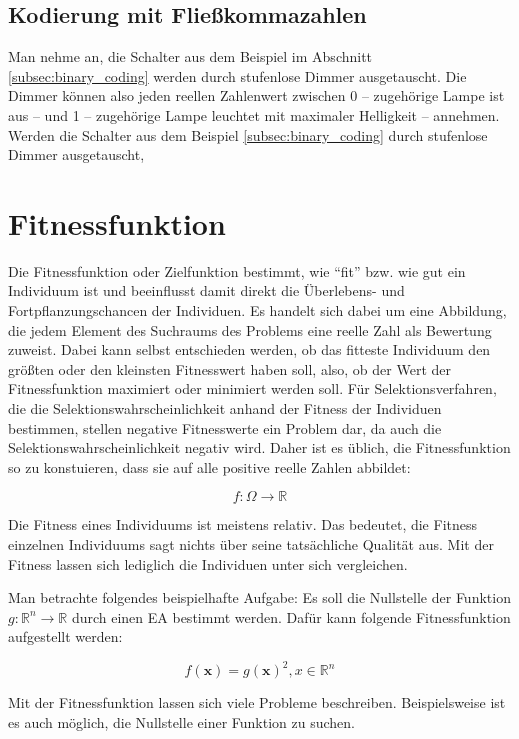 \subsection{Kodierung mit Fließkommazahlen}
Man nehme an, die Schalter aus dem Beispiel im Abschnitt \ref{subsec:binary_coding} werden durch stufenlose Dimmer ausgetauscht. Die Dimmer können also jeden reellen Zahlenwert zwischen 0 -- zugehörige Lampe ist aus -- und 1 -- zugehörige Lampe leuchtet mit maximaler Helligkeit -- annehmen. 
Werden die Schalter aus dem Beispiel \ref{subsec:binary_coding} durch stufenlose Dimmer ausgetauscht, 

\section{Fitnessfunktion}
Die Fitnessfunktion oder Zielfunktion bestimmt, wie "`fit"' bzw. wie gut ein Individuum ist und beeinflusst damit direkt die Überlebens- und Fortpflanzungschancen der Individuen. Es handelt sich dabei um  eine Abbildung, die jedem Element des Suchraums des Problems eine reelle Zahl als Bewertung zuweist. Dabei kann selbst entschieden werden, ob das fitteste Individuum den größten oder den kleinsten Fitnesswert haben soll, also, ob der Wert der Fitnessfunktion maximiert oder minimiert werden soll. Für Selektionsverfahren, die die Selektionswahrscheinlichkeit anhand der Fitness der Individuen bestimmen, stellen negative Fitnesswerte ein Problem dar, da auch die Selektionswahrscheinlichkeit negativ wird. Daher ist es üblich, die Fitnessfunktion so zu konstuieren, dass sie auf alle positive reelle Zahlen abbildet:

\begin{equation}
f: \Omega \to \mathbb{R}
\end{equation}

Die Fitness eines Individuums ist meistens relativ. Das bedeutet, die Fitness einzelnen Individuums sagt nichts über seine tatsächliche Qualität aus. Mit der Fitness lassen sich lediglich die Individuen unter sich vergleichen. 

Man betrachte folgendes beispielhafte Aufgabe: Es soll die Nullstelle der Funktion $g: \mathbb{R}^n \to \mathbb{R}$ durch einen EA bestimmt werden. Dafür kann folgende Fitnessfunktion aufgestellt werden: 

\begin{equation}
f(\mathbf{x}) = g(\mathbf{x})^2, x \in \mathbb{R}^n
\end{equation}

Mit der Fitnessfunktion lassen sich viele Probleme beschreiben. Beispielsweise ist es auch möglich, die Nullstelle einer Funktion zu suchen. 

